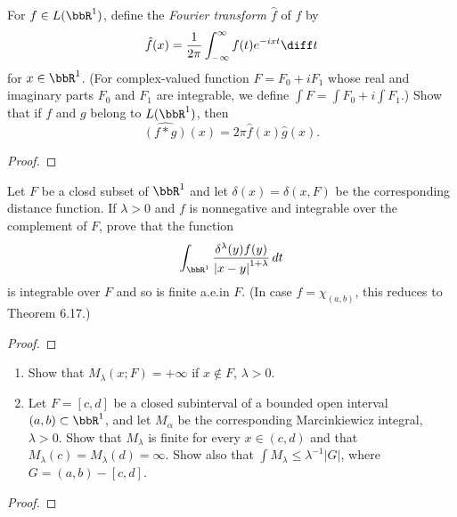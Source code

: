 \begin{problem}
For $f\in L(\bbR^1)$, define the \emph{Fourier transform $\hat f$} of $f$
by
\[
\hat f(x)=\frac{1}{2\pi}\int_{-\infty}^\infty f(t)e^{-ixt}\diff t
\]
for $x\in\bbR^1$. (For complex-valued function $F=F_0+iF_1$ whose real and
imaginary parts $F_0$ and $F_1$ are integrable, we define $\int F=\int
F_0+i\int F_1$.) Show that if $f$ and $g$ belong to $L(\bbR^1)$, then
\[
\widehat{(f*g)}(x)=2\pi\hat f(x)\hat g(x).
\]
\end{problem}
\begin{proof}
\end{proof}
\newpage

\begin{problem}
Let $F$ be a closd subset of $\bbR^1$ and let $\delta(x)=\delta(x,F)$ be
the corresponding distance function. If $\lambda>0$ and $f$ is nonnegative
and integrable over the complement of $F$, prove that the function
\[
\int_{\bbR^1}\frac{\delta^\lambda(y)f(y)}{\left|x-y\right|^{1+\lambda}}\,dt
\]
is integrable over $F$ and so is finite a.e.\@ in $F$. (In case
$f=\chi_{(a,b)}$, this reduces to Theorem 6.17.)
\end{problem}
\begin{proof}
\end{proof}
\newpage

\begin{problem}
\begin{enumerate}[label=(\alph*)]
\item Show that $M_\lambda(x;F)=+\infty$ if $x\notin F$, $\lambda>0$.
\item Let $F=[c,d]$ be a closed subinterval of a bounded open interval
  $(a,b)\subset\bbR^1$, and let $M_\alpha$ be the corresponding
  Marcinkiewicz integral, $\lambda>0$. Show that $M_\lambda$ is finite for
  every $x\in(c,d)$ and that $M_\lambda(c)=M_\lambda(d)=\infty$. Show also
  that $\int M_\lambda\leq\lambda^{-1}|G|$, where $G=(a,b)-[c,d]$.
\end{enumerate}
\end{problem}
\begin{proof}
\end{proof}

